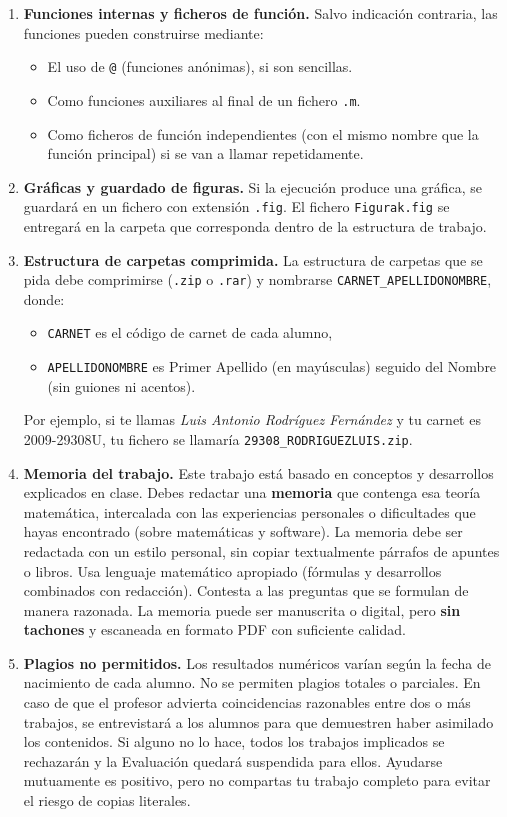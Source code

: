 \documentclass[12pt]{article}
\begin{document}
\begin{enumerate}
  \item \textbf{Funciones internas y ficheros de función.}  
  Salvo indicación contraria, las funciones pueden construirse mediante:
  \begin{itemize}
    \item El uso de \texttt{@} (funciones anónimas), si son sencillas.
    \item Como funciones auxiliares al final de un fichero \texttt{.m}.
    \item Como ficheros de función independientes (con el mismo nombre que la función principal) si se van a llamar repetidamente.
  \end{itemize}

  \item \textbf{Gráficas y guardado de figuras.}  
  Si la ejecución produce una gráfica, se guardará en un fichero con extensión \texttt{.fig}. El fichero \texttt{Figurak.fig} se entregará en la carpeta que corresponda dentro de la estructura de trabajo.

  \item \textbf{Estructura de carpetas comprimida.}  
  La estructura de carpetas que se pida debe comprimirse (\texttt{.zip} o \texttt{.rar}) y nombrarse \texttt{CARNET\_APELLIDONOMBRE}, donde:
  \begin{itemize}
    \item \texttt{CARNET} es el código de carnet de cada alumno,
    \item \texttt{APELLIDONOMBRE} es Primer Apellido (en mayúsculas) seguido del Nombre (sin guiones ni acentos).
  \end{itemize}
  Por ejemplo, si te llamas \textit{Luis Antonio Rodríguez Fernández} y tu carnet es 2009-29308U, tu fichero se llamaría \texttt{29308\_RODRIGUEZLUIS.zip}.

  \item \textbf{Memoria del trabajo.}  
  Este trabajo está basado en conceptos y desarrollos explicados en clase. Debes redactar una \textbf{memoria} que contenga esa teoría matemática, intercalada con las experiencias personales o dificultades que hayas encontrado (sobre matemáticas y software). La memoria debe ser redactada con un estilo personal, sin copiar textualmente párrafos de apuntes o libros. Usa lenguaje matemático apropiado (fórmulas y desarrollos combinados con redacción). Contesta a las preguntas que se formulan de manera razonada.  
  La memoria puede ser manuscrita o digital, pero \textbf{sin tachones} y escaneada en formato PDF con suficiente calidad.

  \item \textbf{Plagios no permitidos.}  
  Los resultados numéricos varían según la fecha de nacimiento de cada alumno. No se permiten plagios totales o parciales. En caso de que el profesor advierta coincidencias razonables entre dos o más trabajos, se entrevistará a los alumnos para que demuestren haber asimilado los contenidos. Si alguno no lo hace, todos los trabajos implicados se rechazarán y la Evaluación quedará suspendida para ellos. Ayudarse mutuamente es positivo, pero no compartas tu trabajo completo para evitar el riesgo de copias literales.

\end{enumerate}
\end{document}
